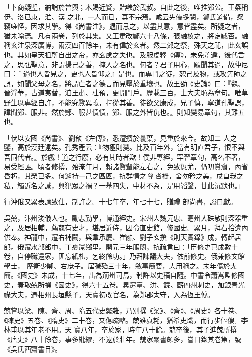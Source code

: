 \begin{pinyinscope}
 「卜商疑聖，納誚於曾輿；木賜近賢，貽嗤於武叔。自此之後，唯推鄭公。王粲稱伊、洛已東，淮、漢
 之北，一人而已，莫不宗焉。咸云先儒多闕，鄭氏道備，粲竊嗟怪，因求其學。得《尚書注》，退而思之，以盡其意，意皆盡矣。所疑之者，猶未喻焉。凡有兩卷，列於其集。又王肅改鄭六十八條，張融核之，將定臧否。融稱玄注泉深廣博，兩漢四百餘年，未有偉於玄者。然二郊之祭，殊天之祀，此玄誤也。其如皇天祖所自出之帝，亦玄慮之失也。及服虔釋《傳》，未免差違，後代言之，思弘聖意，非謂揚己之善，掩人之名也。何者？君子用心，願聞其過，故仲尼曰：『
 過也人皆見之，更也人皆仰之』是也。而專門之徒，恕己及物，或攻先師之誤，如聞父母之名，將謂亡者之德言而見壓於重壤也。故王劭《史論》曰：『魏、晉浮華，古道夷替，洎王肅、杜預，更開門戶。歷載三百，士大夫恥為章句。唯草野生以專經自許，不能究覽異義，擇從其善。徒欲父康成，兄子慎，寧道孔聖誤，諱聞鄭、服非。然於鄭、服甚憒憒，鄭、服之外皆仇也。』則知變易章句，其難五也。



 「伏以安國《尚書》、劉歆《左傳》，悉遭擯於曩葉，見重於來今。故知二
 人之鑒，高於漢廷遠矣。孔秀產云：『物極則變。比及百年外，當有明直君子，恨不與吾同代者。』於戲！道之行廢，必有其時者歟！僕非專經，罕習章句，高名不著，易受經誣。頃者修撰，殆淹年月，賴諸賢輩能左右之，免致愆尤，仍叨賞齎，內省昏朽，其榮已多。何遽持一己之區區，抗群情之噂沓褷，舍勿矜之美，成自我之私，觸近名之誡，興犯眾之禍？一舉四失，中材不為，是用韜聲，甘此沉默也。」



 行沖俄又累表請致仕，制許之。十七年卒，年七十七，贈禮
 部尚書，謚曰獻。



 吳兢，汴州浚儀人也。勵志勤學，博通經史。宋州人魏元忠、亳州人硃敬則深器重之，及居相輔，薦兢有史才，堪居近侍，因令直史館，修國史。累月，拜右拾遺內供奉。神龍中，遷右補闕，與韋承慶、崔融、劉子玄撰《則天實錄》成，轉起居郎。俄遷水部郎中，丁憂還鄉里。開元三年服闋，抗疏言曰：「臣修史已成數十卷，自停職還家，匪忘紙札，乞終餘功。」乃拜諫議大夫，依前修史。俄兼修文館學士，
 歷衛少卿、右庶子。居職殆三十年，敘事簡要，人用稱之。末年傷於太簡。《國史》未成，十七年，出為荊州司馬，制許以史稿自隨。中書令蕭嵩監修國史，奏取兢所撰《國史》，得六十五卷。累遷臺、洪、饒、蘄四州刺史，加銀青光祿大夫，遷相州長垣縣子。天寶初改官名，為鄴郡太守，入為恆王傅。



 兢嘗以梁、陳、齊、周、隋五代史繁雜，乃別撰《梁》、《齊》、《周史》各十卷、《陳史》五卷、《隋史》二十卷，又傷疏略。兢雖衰耗，猶希史職，而行步傴僂，李林甫以其年老不用。天
 寶八年，卒於家，時年八十餘。兢卒後，其子進兢所撰《唐史》八十餘卷，事多紕繆，不逮於壯年。兢家聚書頗多，嘗目錄其卷第，號《吳氏西齋書目》。




\end{pinyinscope}
